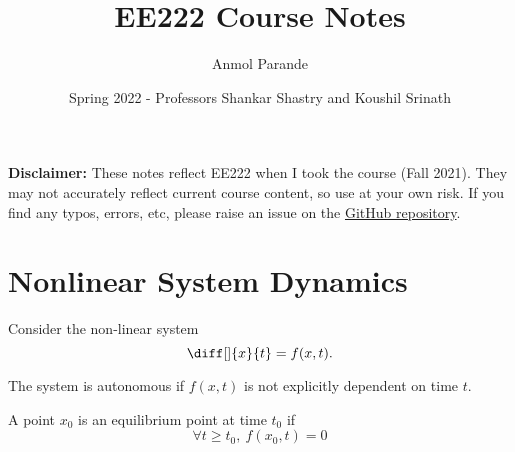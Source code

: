 

\title{EE222 Course Notes}
\author{Anmol Parande}
\date{Spring 2022 - Professors Shankar Shastry and Koushil Srinath}
\maketitle
\textbf{Disclaimer: }These notes reflect EE222 when I took the course (Fall 2021). They may not accurately reflect current course content, so use at your own risk.
If you find any typos, errors, etc, please raise an issue on the \href{https://github.com/parandea17/BerkeleyNotes}{GitHub repository}.
\tableofcontents
\newpage
\section{Nonlinear System Dynamics}
Consider the non-linear system \[
	\diff[]{x}{t} = f(x, t).
\]
\begin{definition}
	The system is autonomous if $f(x, t)$ is not explicitly dependent on time $t$.
	\label{defn:autonomous-system}
\end{definition}
\begin{definition}
	A point $x_0$ is an equilibrium point at time $t_0$ if \[
		\forall t \geq t_0, \ f(x_0, t) = 0 
	\]
	\label{defn:equilibrium-point}
\end{definition}
